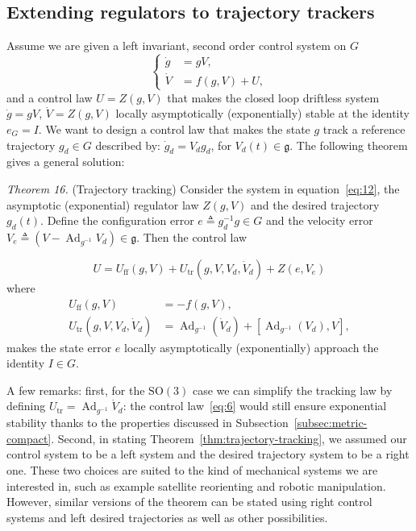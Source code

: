 \documentclass[10pt,twocolumn]{article}
\newcommand{\SO}{\mathrm{SO}}
\newcommand{\gfrak}{\mathfrak g}
\newcommand{\Ad}{\operatorname{Ad}}
\newcounter{paperitem}
\newcommand{\paperhead}[3]{\refstepcounter{paperitem}\par\medskip\noindent\textit{#1}\label{#3} #2\par}
\begin{document}
\subsection{Extending regulators to trajectory trackers}\label{subsec:regulators-to-trackers}
Assume we are given a left invariant, second order control system on $G$
\begin{equation*}
\left\{\begin{aligned}
\dot g&=gV,\\
\dot V&=f(g,V)+U,
\end{aligned}\right.\tag{12}\label{eq:12}
\end{equation*}
and a control law $U=Z(g,V)$ that makes the closed loop driftless system $\dot g=gV$, $\dot V=Z(g,V)$ locally asymptotically (exponentially) stable at the identity $e_G=I$. We want to design a control law that makes the state $g$ track a reference trajectory $g_d\in G$ described by: $\dot g_d=V_dg_d$, for $V_d(t)\in\gfrak$. The following theorem gives a general solution:

\paperhead{Theorem 16.}{(Trajectory tracking) Consider the system in equation~\eqref{eq:12}, the asymptotic (exponential) regulator law $Z(g,V)$ and the desired trajectory $g_d(t)$. Define the configuration error $e\triangleq g_d^{-1}g\in G$ and the velocity error $V_e\triangleq(V-\Ad_{g^{-1}}V_d)\in\gfrak$. Then the control law}{thm:trajectory-tracking}
\begin{equation*}
U=U_{\mathrm{ff}}(g,V)+U_{\mathrm{tr}}(g,V,V_d,\dot V_d)+Z(e,V_e)
\end{equation*}
where
\begin{align*}
U_{\mathrm{ff}}(g,V)&=-f(g,V),\\
U_{\mathrm{tr}}(g,V,V_d,\dot V_d)
&=\Ad_{g^{-1}}(\dot V_d)+[\Ad_{g^{-1}}(V_d),V],
\end{align*}
makes the state error $e$ locally asymptotically (exponentially) approach the identity $I\in G$.

A few remarks: first, for the $\SO(3)$ case we can simplify the tracking law by defining $U_{\mathrm{tr}}=\Ad_{g^{-1}}\dot V_d$: the control law~\eqref{eq:6} would still ensure exponential stability thanks to the properties discussed in Subsection~\ref{subsec:metric-compact}. Second, in stating Theorem~\ref{thm:trajectory-tracking}, we assumed our control system to be a left system and the desired trajectory system to be a right one. These two choices are suited to the kind of mechanical systems we are interested in, such as example satellite reorienting and robotic manipulation. However, similar versions of the theorem can be stated using right control systems and left desired trajectories as well as other possibilities.
\end{document}
